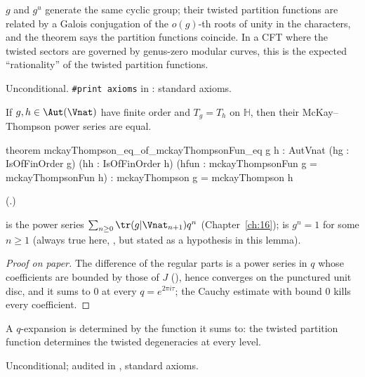\begin{physics}
$g$ and $g^u$ generate the same cyclic group; their twisted partition functions are related by a Galois conjugation of
the $o(g)$-th roots of unity in the characters, and the theorem says the partition functions coincide.  In a CFT where the
twisted sectors are governed by genus-zero modular curves, this is the expected ``rationality'' of the twisted partition
functions.
\end{physics}
\begin{status}Unconditional.  \texttt{\#print axioms} in : standard
axioms.\end{status}

\begin{theorem}\label{ch22:thm:coeff}
If $g,h\in\Aut(\Vnat)$ have finite order and $T_g=T_h$ on $\mathbb H$, then their McKay--Thompson power series are equal.
\end{theorem}
\begin{leancode}
theorem mckayThompson_eq_of_mckayThompsonFun_eq {g h : AutVnat} (hg : IsOfFinOrder g)
    (hh : IsOfFinOrder h) (hfun : mckayThompsonFun g = mckayThompsonFun h) :
    mckayThompson g = mckayThompson h
\end{leancode}
(.)
\begin{dictionary}
 is the power series $\sum_{n\ge0}\tr(g|\Vnat_{n+1})q^n$ (Chapter~\ref{ch:16}); 
is $g^n=1$ for some $n\ge1$ (always true here, , but stated as a hypothesis in this lemma).
\end{dictionary}
\begin{proof}[Proof on paper]
The difference of the regular parts is a power series in $q$ whose coefficients are bounded by those of $J$
(), hence converges on the punctured unit disc, and it sums to $0$ at every
$q=e^{2\pi i\tau}$; the Cauchy estimate  with bound $0$ kills every coefficient.
\end{proof}
\begin{physics}A $q$-expansion is determined by the function it sums to: the twisted partition function determines the
twisted degeneracies at every level.\end{physics}
\begin{status}Unconditional; audited in , standard axioms.\end{status}

